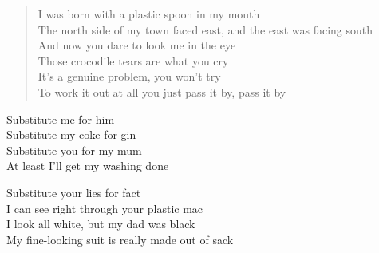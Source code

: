 \begin{song}
    \begin{verse}
        I was born with a plastic spoon in my mouth \\
        The north side of my town faced east, and the east was facing south \\
        And now you dare to look me in the eye \\
        Those crocodile tears are what you cry \\
        It's a genuine problem, you won't try \\
        To work it out at all you just pass it by, pass it by
    \end{verse}

    \begin{chorus}
        Substitute me for him \\
        Substitute my coke for gin \\
        Substitute you for my mum \\
        At least I'll get my washing done
    \end{chorus}

    \begin{chorus}
        Substitute your lies for fact \\
        I can see right through your plastic mac \\
        I look all white, but my dad was black \\
        My fine-looking suit is really made out of sack
    \end{chorus}

\end{song}